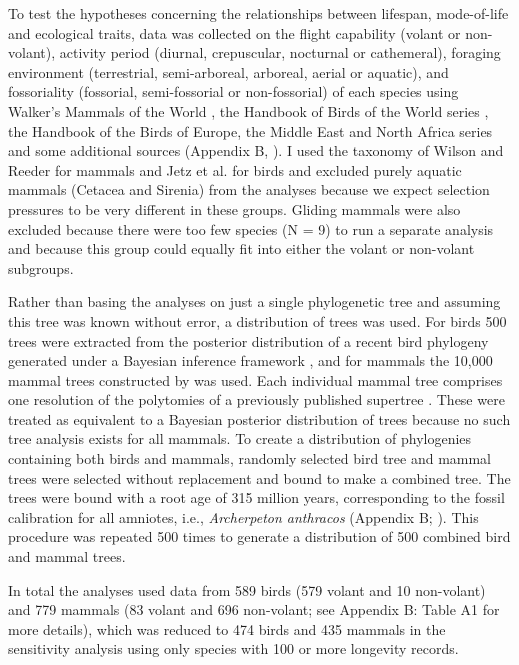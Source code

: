 To test the hypotheses concerning the relationships between lifespan, mode-of-life and ecological traits, data was collected on the flight capability (volant or non-volant), activity period (diurnal, crepuscular, nocturnal or cathemeral), foraging environment (terrestrial, semi-arboreal, arboreal, aerial or aquatic), and fossoriality (fossorial, semi-fossorial or non-fossorial) of each species using Walker's Mammals of the World \citep{nowak1999walker}, the Handbook of Birds of the World series \citep{hoyo1992handbook}, the Handbook of the Birds of Europe, the Middle East and North Africa series \citep{cramp1977handbook} and some additional sources (Appendix B, \citep{fry2010kingfishers,parr2010parrots,williams1995penguins}). I used the taxonomy of Wilson and Reeder \citep{wilson2005mammal} for mammals and Jetz et al. \cite{jetz2012global} for birds and excluded purely aquatic mammals (Cetacea and Sirenia) from the analyses because we expect selection pressures to be very different in these groups. Gliding mammals were also excluded because there were too few species (N = 9) to run a separate analysis and because this group could equally fit into either the volant or non-volant subgroups.


Rather than basing the analyses on just a single phylogenetic tree and assuming this tree was known without error, a distribution of trees was used. For birds 500 trees were extracted from the posterior distribution of a recent bird phylogeny generated under a Bayesian inference framework \citep{jetz2012global}, and for mammals the 10,000 mammal trees constructed by \cite{kuhn2011simple} was used. Each individual mammal tree comprises one resolution of the polytomies of a previously published supertree \citep{bininda2007delayed}. These were treated as equivalent to a Bayesian posterior distribution of trees because no such tree analysis exists for all mammals. To create a distribution of phylogenies containing both birds and mammals, randomly selected bird tree and mammal trees were selected without replacement and bound to make a combined tree. The trees were bound with a root age of 315 million years, corresponding to the fossil calibration for all amniotes, i.e.,  \textit{Archerpeton anthracos} (Appendix B; \citep{reisz2004molecular}). This procedure was repeated 500 times to generate a distribution of 500 combined bird and mammal trees.


In total the analyses used data from 589 birds (579 volant and 10 non-volant) and 779 mammals (83 volant and 696 non-volant; see Appendix B: Table A1 for more details), which was reduced to 474 birds and 435 mammals in the sensitivity analysis using only species with 100 or more longevity records.


